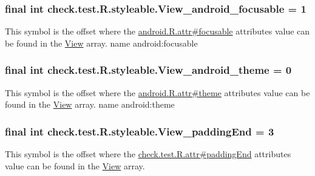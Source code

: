 \subsubsection[{View\+\_\+android\+\_\+focusable}]{\setlength{\rightskip}{0pt plus 5cm}final int check.\+test.\+R.\+styleable.\+View\+\_\+android\+\_\+focusable = 1\hspace{0.3cm}{\ttfamily [static]}}\label{classcheck_1_1test_1_1_r_1_1styleable_a92aa4c0c838d8cd1dbd8bbcbdcdaa904}
This symbol is the offset where the \hyperlink{}{android.\+R.\+attr\#focusable} attribute\textquotesingle{}s value can be found in the \hyperlink{classcheck_1_1test_1_1_r_1_1styleable_a649d1cf46b1780fca1185680fabbb1e1}{View} array.  name android\+:focusable \hypertarget{classcheck_1_1test_1_1_r_1_1styleable_a183c98f0eb7fd5d876f22dc7611d3e5a}{}
\subsubsection[{View\+\_\+android\+\_\+theme}]{\setlength{\rightskip}{0pt plus 5cm}final int check.\+test.\+R.\+styleable.\+View\+\_\+android\+\_\+theme = 0\hspace{0.3cm}{\ttfamily [static]}}\label{classcheck_1_1test_1_1_r_1_1styleable_a183c98f0eb7fd5d876f22dc7611d3e5a}
This symbol is the offset where the \hyperlink{}{android.\+R.\+attr\#theme} attribute\textquotesingle{}s value can be found in the \hyperlink{classcheck_1_1test_1_1_r_1_1styleable_a649d1cf46b1780fca1185680fabbb1e1}{View} array.  name android\+:theme \hypertarget{classcheck_1_1test_1_1_r_1_1styleable_a77eb809eaf7c2d90a2605681fd89ab20}{}
\subsubsection[{View\+\_\+padding\+End}]{\setlength{\rightskip}{0pt plus 5cm}final int check.\+test.\+R.\+styleable.\+View\+\_\+padding\+End = 3\hspace{0.3cm}{\ttfamily [static]}}\label{classcheck_1_1test_1_1_r_1_1styleable_a77eb809eaf7c2d90a2605681fd89ab20}
This symbol is the offset where the \hyperlink{classcheck_1_1test_1_1_r_1_1attr_a3817ccbc2ce29aa2aedb06d9517a49d0}{check.\+test.\+R.\+attr\#padding\+End} attribute\textquotesingle{}s value can be found in the \hyperlink{classcheck_1_1test_1_1_r_1_1styleable_a649d1cf46b1780fca1185680fabbb1e1}{View} array.

